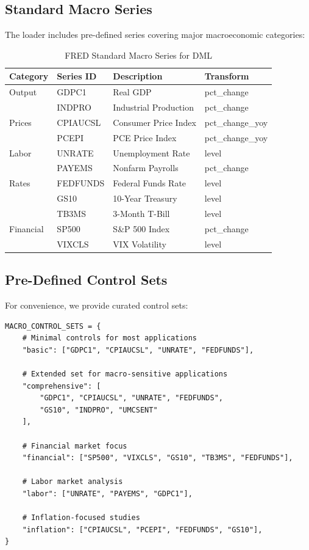\subsection{Standard Macro Series}

The loader includes pre-defined series covering major macroeconomic categories:

\begin{table}[htbp]
\centering
\caption{FRED Standard Macro Series for DML}
\label{tab:fred_series}
\begin{tabular}{llll}
\hline
\textbf{Category} & \textbf{Series ID} & \textbf{Description} & \textbf{Transform} \\
\hline
Output & GDPC1 & Real GDP & pct\_change \\
       & INDPRO & Industrial Production & pct\_change \\
\hline
Prices & CPIAUCSL & Consumer Price Index & pct\_change\_yoy \\
       & PCEPI & PCE Price Index & pct\_change\_yoy \\
\hline
Labor & UNRATE & Unemployment Rate & level \\
      & PAYEMS & Nonfarm Payrolls & pct\_change \\
\hline
Rates & FEDFUNDS & Federal Funds Rate & level \\
      & GS10 & 10-Year Treasury & level \\
      & TB3MS & 3-Month T-Bill & level \\
\hline
Financial & SP500 & S\&P 500 Index & pct\_change \\
          & VIXCLS & VIX Volatility & level \\
\hline
\end{tabular}
\end{table}

\subsection{Pre-Defined Control Sets}

For convenience, we provide curated control sets:

\begin{verbatim}
MACRO_CONTROL_SETS = {
    # Minimal controls for most applications
    "basic": ["GDPC1", "CPIAUCSL", "UNRATE", "FEDFUNDS"],

    # Extended set for macro-sensitive applications
    "comprehensive": [
        "GDPC1", "CPIAUCSL", "UNRATE", "FEDFUNDS",
        "GS10", "INDPRO", "UMCSENT"
    ],

    # Financial market focus
    "financial": ["SP500", "VIXCLS", "GS10", "TB3MS", "FEDFUNDS"],

    # Labor market analysis
    "labor": ["UNRATE", "PAYEMS", "GDPC1"],

    # Inflation-focused studies
    "inflation": ["CPIAUCSL", "PCEPI", "FEDFUNDS", "GS10"],
}
\end{verbatim}

